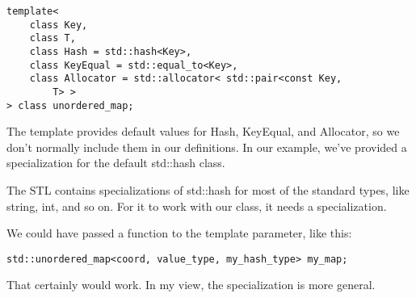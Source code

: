 \begin{lstlisting}[style=styleCXX]
template<
	class Key,
	class T,
	class Hash = std::hash<Key>,
	class KeyEqual = std::equal_to<Key>,
	class Allocator = std::allocator< std::pair<const Key,
		T> >
> class unordered_map;
\end{lstlisting}

The template provides default values for Hash, KeyEqual, and Allocator, so we don't normally include them in our definitions. In our example, we've provided a specialization for the default std::hash class.

The STL contains specializations of std::hash for most of the standard types, like string, int, and so on. For it to work with our class, it needs a specialization.

We could have passed a function to the template parameter, like this:

\begin{lstlisting}[style=styleCXX]
std::unordered_map<coord, value_type, my_hash_type> my_map;
\end{lstlisting}

That certainly would work. In my view, the specialization is more general.





